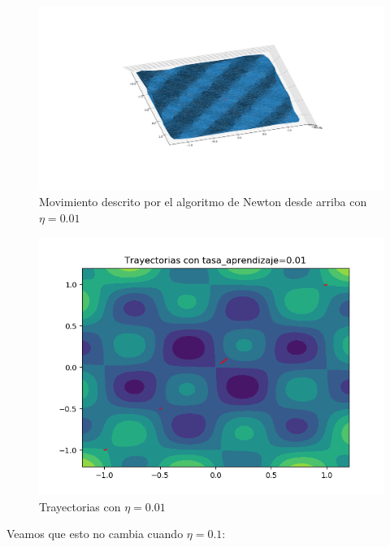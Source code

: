 \documentclass[12pt,a4paper]{article}
\begin{document}
\begin{figure}[H]
	\centering
	\includegraphics[scale=0.4]{./Imagenes/bonus7.png}
	\caption{Movimiento descrito por el algoritmo de Newton desde arriba con $\eta=0.01$}
\end{figure}

\begin{figure}[H]
	\centering
	\includegraphics[scale=0.8]{./Imagenes/bonus12.png}
	\caption{Trayectorias con $\eta=0.01$}
\end{figure}

Veamos que  esto no cambia cuando $\eta=0.1$:
\end{document}
